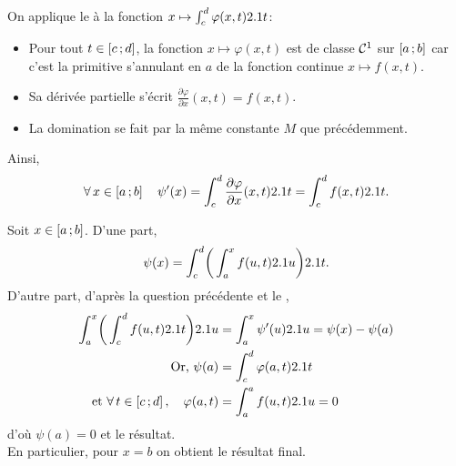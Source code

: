 \begin{solution}
\begin{reponses}
\item On applique le  à la fonction $x \mapsto \int_{c}^{d} \varphi(x, t) 2.1 t$:
        \begin{itemize}
            \item Pour tout $t \in \left[c\,;d\right]$, la fonction $x \mapsto \varphi(x, t)$ est de classe $\mathcal{C}^1$ sur $\left[a\,;b\right]$ car c'est la primitive s'annulant en $a$ de la fonction continue $x \mapsto f(x, t)$. 
            \item Sa dérivée partielle s'écrit $\frac{\partial \varphi}{\partial x}(x, t) = f(x, t)$.
            \item La domination se fait par la même constante $M$ que précédemment. 
            \end{itemize}
            Ainsi,
            \[
            \forall x \in \interff{a}{b} \quad \psi'(x) = \int_c^d \frac{\partial \varphi}{\partial x}(x, t) \d t = \int_{c}^{d} f(x, t) \d t.
            \]
        \item Soit $x \in \left[a\,;b\right]$. D'une part,
        $$\psi(x) = \int_{c}^{d} \mathopen{}\bigg( \int_{a}^{x} f(u,t) 2.1 u \bigg) 2.1 t.$$
        D'autre part, d'après la question précédente et le , 
        \begin{align*}
            \int_{a}^{x} \mathopen{}\bigg( \int_{c}^{d} f(u,t) \d t \bigg) \d u &= \int_{a}^{x} \psi'(u) \d u  = \psi(x) - \psi(a) \\
            \text{Or, } \psi(a) &= \int_{c}^{d} \varphi(a, t) \d t \\
            \text{et } \forall t \in \interff{c}{d}, \quad \varphi(a, t) &= \int_{a}^{a} f(u, t) \d u = 0
        \end{align*}
        d'où $\psi(a) = 0$ et le résultat. \\
        En particulier, pour $x = b$ on obtient le résultat final.
    \end{reponses}
\end{solution}    

